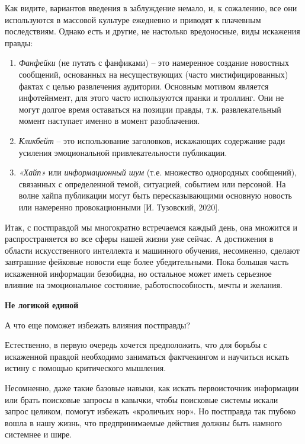 Как видите, вариантов введения в заблуждение немало, и, к сожалению, все они используются в массовой культуре ежедневно и приводят к плачевным последствиям. Однако есть и другие, не настолько вредоносные, виды искажения правды:

\begin{enumerate}
    \item \textit{Фанфейки} (не путать с фанфиками) – это намеренное создание новостных сообщений, основанных на несуществующих (часто мистифицированных) фактах с целью развлечения аудитории. Основным мотивом является инфотейнмент, для этого часто используются пранки и троллинг. Они не могут долгое время оставаться на позиции правды, т.к. развлекательный момент наступает именно в момент разоблачения.
    \item \textit{Кликбейт} – это использование заголовков, искажающих содержание ради усиления эмоциональной привлекательности публикации.
    \item \textit{«Хайп»} или \textit{информационный шум} (т.е. множество однородных сообщений), связанных с определенной темой, ситуацией, событием или персоной. На волне хайпа публикации могут быть пересказывающими основную новость или намеренно провокационными [И. Тузовский, 2020].
\end{enumerate}

Итак, с постправдой мы многократно встречаемся каждый день, она множится и распространяется во все сферы нашей жизни уже сейчас. А достижения в области искусственного интеллекта и машинного обучения, несомненно, сделают завтрашние фейковые новости еще более убедительными. Пока большая часть искаженной информации безобидна, но остальное может иметь серьезное влияние на эмоциональное состояние, работоспособность, мечты и желания.

\textbf{Не логикой единой}

А что еще поможет избежать влияния постправды?

Естественно, в первую очередь хочется предположить, что для борьбы с искаженной правдой необходимо заниматься фактчекингом и научиться искать истину с помощью критического мышления.

Несомненно, даже такие базовые навыки, как искать первоисточник информации или брать поисковые запросы в кавычки, чтобы поисковые системы искали запрос целиком, помогут избежать «кроличьих нор». Но постправда так глубоко вошла в нашу жизнь, что предпринимаемые действия должны быть намного системнее и шире.

